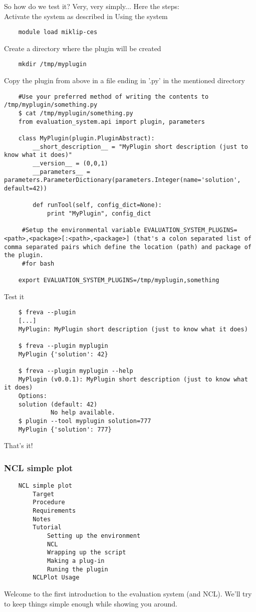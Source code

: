 \documentclass[a4paper,11pt]{ltxdoc}
\begin{document}
So how do we test it? Very, very simply... Here the steps: \\

    Activate the system as described in Using the system
\begin{lstlisting}
    module load miklip-ces
\end{lstlisting}
    Create a directory where the plugin will be created
\begin{lstlisting}
    mkdir /tmp/myplugin
\end{lstlisting}
    Copy the plugin from above in a file ending in '.py' in the mentioned directory
\begin{lstlisting}
    #Use your preferred method of writing the contents to /tmp/myplugin/something.py
    $ cat /tmp/myplugin/something.py
    from evaluation_system.api import plugin, parameters

    class MyPlugin(plugin.PluginAbstract):
        __short_description__ = "MyPlugin short description (just to know what it does)" 
        __version__ = (0,0,1)
        __parameters__ =  parameters.ParameterDictionary(parameters.Integer(name='solution', default=42))

        def runTool(self, config_dict=None):
            print "MyPlugin", config_dict

     #Setup the environmental variable EVALUATION_SYSTEM_PLUGINS=<path>,<package>[:<path>,<package>] (that's a colon separated list of comma separated pairs which define the location (path) and package of the plugin.
     #for bash

    export EVALUATION_SYSTEM_PLUGINS=/tmp/myplugin,something
\end{lstlisting}
    Test it
\begin{lstlisting}
    $ freva --plugin
    [...]
    MyPlugin: MyPlugin short description (just to know what it does)

    $ freva --plugin myplugin
    MyPlugin {'solution': 42}

    $ freva --plugin myplugin --help
    MyPlugin (v0.0.1): MyPlugin short description (just to know what it does)
    Options:
    solution (default: 42)
             No help available.
    $ plugin --tool myplugin solution=777
    MyPlugin {'solution': 777}
\end{lstlisting}
That's it!

\subsubsection{NCL simple plot}
\begin{lstlisting}
    NCL simple plot
        Target
        Procedure
        Requirements
        Notes
        Tutorial
            Setting up the environment
            NCL
            Wrapping up the script
            Making a plug-in
            Runing the plugin
        NCLPlot Usage
\end{lstlisting}
Welcome to the first introduction to the evaluation system (and NCL). We'll try to keep things simple enough while showing you around.
\end{document}
